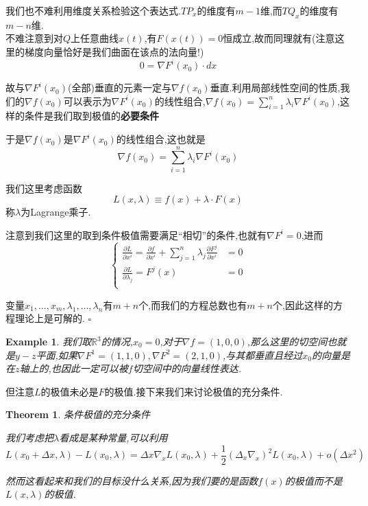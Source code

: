 \documentclass[11pt,hyperref,a4paper,UTF8]{ctexart}
\newtheorem{theorem}{Theorem}[subsection]
\newtheorem{example}{Example}[subsection]
\newenvironment{cproof}{%
\heiti{证明}\kaishu
}{%
  \hfill $\square$
  \par\bigskip
}
\newcommand{\RR}{\mathbb{R}}
\newcommand{\parameter}[1]{\left(#1\right)}
\begin{document}
\begin{CJK}{UTF8}{gkai}
\begin{cproof}
我们也不难利用维度关系检验这个表达式.$TP_x$的维度有$m - 1$维,而$TQ_x$的维度有$m - n$维.\\

不难注意到对$Q$上任意曲线$x(t)$,有$F(x(t)) = 0$恒成立,故而同理就有(注意这里的梯度向量恰好是我们曲面在该点的法向量!)
\[0 = \nabla F^i(x_0) \cdot dx\]

故与$\nabla F^i(x_0)$(全部)垂直的元素一定与$\nabla f(x_0)$垂直.利用局部线性空间的性质,我们的$\nabla f(x_0)$可以表示为$\nabla F^i(x_0)$的线性组合,$\nabla f(x_0) = \sum_{i = 1}^{n}\lambda_i\nabla F^i(x_0)$,这样的条件是我们取到极值的\textbf{必要条件}

于是$\nabla f(x_0)$是$\nabla F^i(x_0)$的线性组合,这也就是
\[\nabla f(x_0) = \sum_{i = 1}^{n} \lambda_i \nabla F^i(x_0)\]

我们这里考虑函数
\[L(x,\lambda) \equiv f(x) + \lambda \cdot F(x)\]
称$\lambda$为Lagrange乘子.

注意到我们这里的取到条件极值需要满足``相切''的条件,也就有$\nabla F^i = 0$,进而
\[
\begin{cases}
  \frac{\partial L}{\partial x^i} = \frac{\partial f}{\partial x^i} + \sum_{j = 1}^{n} \lambda_j \frac{\partial F^j}{\partial x^i} &= 0\\
  \frac{\partial L}{\partial\lambda_j} = F^j(x) &= 0\\
\end{cases}
\]

变量$x_1,\ldots,x_m,\lambda_1,\ldots,\lambda_n$有$m + n$个,而我们的方程总数也有$m + n$个,因此这样的方程理论上是可解的.
\end{cproof}

\begin{example}
我们取$\RR^3$的情况,$x_0 = 0$,对于$\nabla f = (1,0,0)$,那么这里的切空间也就是$y-z$平面,如果$\nabla F^1 = (1,1,0),\nabla F^2 = (2,1,0)$,与其都垂直且经过$x_0$的向量是在$z$轴上的,也因此一定可以被$f$切空间中的向量线性表达.
\end{example}

但注意$L$的极值未必是$F$的极值.接下来我们来讨论极值的充分条件.

\begin{theorem}
  条件极值的充分条件

我们考虑把$\lambda$看成是某种常量,可以利用
\[L(x_0 + \Delta x,\lambda) - L(x_0,\lambda) = \Delta x \nabla_x L(x_0,\lambda) + \frac{1}{2}\parameter{\Delta_x \nabla_x}^2 L(x_0,\lambda) + o(\Delta x^2)\]

然而这看起来和我们的目标没什么关系,因为我们要的是函数$f(x)$的极值而不是$L(x,\lambda)$的极值.\\


\end{theorem}
\end{CJK}
\end{document}
